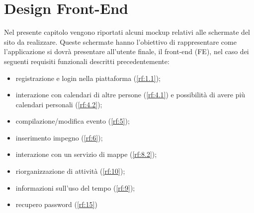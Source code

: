\section{Design Front-End}
\label{sec:RequisitiFrontEnd}

Nel presente capitolo vengono riportati alcuni mockup relativi alle schermate del sito da realizzare. Queste schermate hanno l’obiettivo di rappresentare come l’applicazione si dovrà presentare all’utente finale, il front-end (FE), nel caso dei seguenti requisiti funzionali descritti precedentemente: 
\begin{itemize}
    \item registrazione e login nella piattaforma (\ref{rf:1.1});
    \item interazione con calendari di altre persone (\ref{rf:4.1}) e possibilità di avere più calendari personali (\ref{rf:4.2});
    \item compilazione/modifica evento (\ref{rf:5});
    \item inserimento impegno (\ref{rf:6});
    \item interazione con un servizio di mappe (\ref{rf:8.2});
    \item riorganizzazione di attività (\ref{rf:10});
    \item informazioni sull’uso del tempo (\ref{rf:9});
    \item recupero password (\ref{rf:15}) %
\end{itemize}

